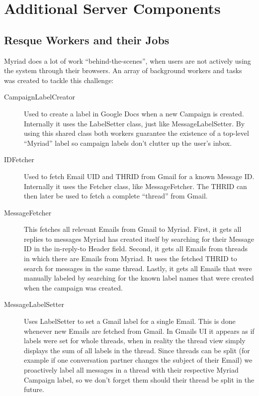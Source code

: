 \section{Additional Server Components}

\subsection{Resque Workers and their Jobs}

Myriad does a lot of work ``behind-the-scenes'', when users are not actively using the system through their browsers. An array of background workers and tasks was created to tackle this challenge:

\begin{description}

\item[CampaignLabelCreator] Used to create a label in Google Docs when a new Campaign is created. Internally it uses the LabelSetter class, just like MessageLabelSetter. By using this shared class both workers guarantee the existence of a top-level ``Myriad'' label so campaign labels don't clutter up the user's inbox.

\item[IDFetcher] Used to fetch Email UID and THRID from Gmail for a known Message ID. Internally it uses the Fetcher class, like MessageFetcher. The THRID can then later be used to fetch a complete ``thread'' from Gmail.

\item[MessageFetcher] This fetches all relevant Emails from Gmail to Myriad. First, it gets all replies to messages Myriad has created itself by searching for their Message ID in the in-reply-to Header field. Second, it gets all Emails from threads in which there are Emails from Myriad. It uses the fetched THRID to search for messages in the same thread. Lastly, it gets all Emails that were manually labeled by searching for the known label names that were created when the campaign was created.

\item[MessageLabelSetter] Uses LabelSetter to set a Gmail label for a single Email. This is done whenever new Emails are fetched from Gmail. In Gmails UI it appears as if labels were set for whole threads, when in reality the thread view simply displays the sum of all labels in the thread. Since threads can be split (for example if one conversation partner changes the subject of their Email) we proactively label all messages in a thread with their respective Myriad Campaign label, so we don't forget them should their thread be split in the future.


\end{description}
